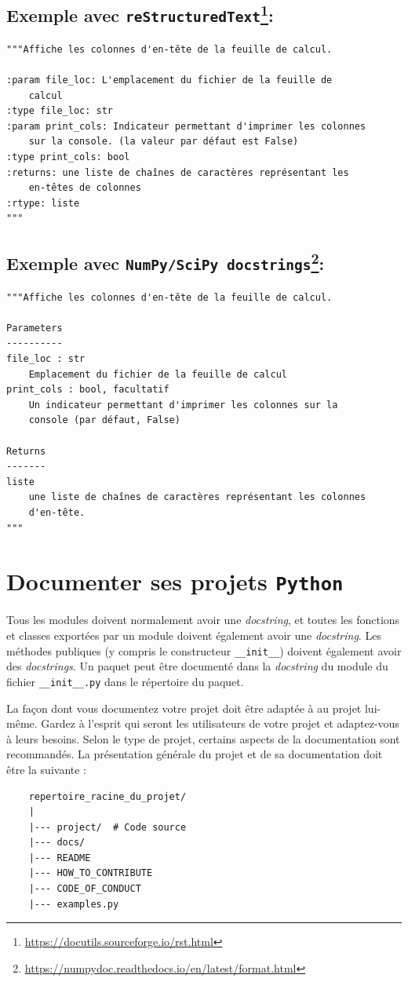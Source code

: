 \documentclass[a4paper,12pt]{book}
\begin{document}
\subsection*{Exemple avec \texttt{reStructuredText}\footnote{\url{https://docutils.sourceforge.io/rst.html}}:}
\begin{lstlisting}
"""Affiche les colonnes d'en-tête de la feuille de calcul.

:param file_loc: L'emplacement du fichier de la feuille de 
    calcul
:type file_loc: str
:param print_cols: Indicateur permettant d'imprimer les colonnes 
    sur	la console. (la valeur par défaut est False)
:type print_cols: bool
:returns: une liste de chaînes de caractères représentant les 
	en-têtes de colonnes
:rtype: liste
"""
\end{lstlisting}
\medskip

\subsection*{Exemple avec \texttt{NumPy/SciPy docstrings}\footnote{\url{https://numpydoc.readthedocs.io/en/latest/format.html}}:}
\begin{lstlisting}
"""Affiche les colonnes d'en-tête de la feuille de calcul.

Parameters
----------
file_loc : str
    Emplacement du fichier de la feuille de calcul
print_cols : bool, facultatif
    Un indicateur permettant d'imprimer les colonnes sur la 
    console (par défaut, False)

Returns
-------
liste
    une liste de chaînes de caractères représentant les colonnes 
    d'en-tête.
"""
\end{lstlisting}
\medskip

\section{Documenter ses projets \texttt{Python}}
Tous les modules doivent normalement avoir une \textit{docstring}, et toutes les fonctions et classes exportées par un module doivent également avoir une \textit{docstring}. Les méthodes publiques (y compris le constructeur \texttt{\_\_init\_\_}) doivent également avoir des \textit{docstrings}. Un paquet peut être documenté dans la \textit{docstring} du module du fichier \texttt{\_\_init\_\_.py} dans le répertoire du paquet.
\medskip

La façon dont vous documentez votre projet doit être adaptée à au projet lui-même. Gardez à l'esprit qui seront les utilisateurs de votre projet et adaptez-vous à leurs besoins. Selon le type de projet, certains aspects de la documentation sont recommandés. La présentation générale du projet et de sa documentation doit être la suivante :
\begin{verbatim}
    repertoire_racine_du_projet/
    |
    |--- project/  # Code source
    |--- docs/
    |--- README
    |--- HOW_TO_CONTRIBUTE
    |--- CODE_OF_CONDUCT
    |--- examples.py
\end{verbatim}
\medskip
\end{document}
